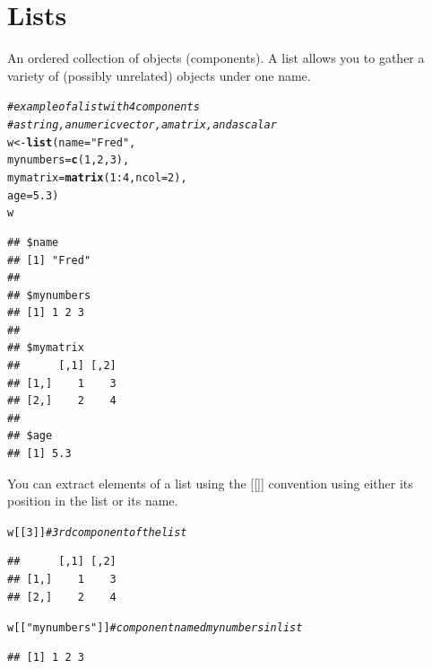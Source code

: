 \documentclass[english,nohyper]{tufte-book}\usepackage[]{graphicx}\usepackage[]{color}
\makeatletter
\newcommand{\hlnum}[1]{\textcolor[rgb]{0.686,0.059,0.569}{#1}}%
\newcommand{\hlstr}[1]{\textcolor[rgb]{0.192,0.494,0.8}{#1}}%
\newcommand{\hlcom}[1]{\textcolor[rgb]{0.678,0.584,0.686}{\textit{#1}}}%
\newcommand{\hlopt}[1]{\textcolor[rgb]{0,0,0}{#1}}%
\newcommand{\hlstd}[1]{\textcolor[rgb]{0.345,0.345,0.345}{#1}}%
\newcommand{\hlkwb}[1]{\textcolor[rgb]{0.69,0.353,0.396}{#1}}%
\newcommand{\hlkwc}[1]{\textcolor[rgb]{0.333,0.667,0.333}{#1}}%
\newcommand{\hlkwd}[1]{\textcolor[rgb]{0.737,0.353,0.396}{\textbf{#1}}}%
\newenvironment{kframe}{%
 \def\at@end@of@kframe{}%
 \ifinner\ifhmode%
  \def\at@end@of@kframe{\end{minipage}}%
  \begin{minipage}{\columnwidth}%
 \fi\fi%
 \def\FrameCommand##1{\hskip\@totalleftmargin \hskip-\fboxsep
 \colorbox{shadecolor}{##1}\hskip-\fboxsep
     \hskip-\linewidth \hskip-\@totalleftmargin \hskip\columnwidth}%
 \MakeFramed {\advance\hsize-\width
   \@totalleftmargin\z@ \linewidth\hsize
   \@setminipage}}%
 {\par\unskip\endMakeFramed%
 \at@end@of@kframe}
\newenvironment{knitrout}{}{} %
\makeatother
\begin{document}
\section{Lists}

An ordered collection of objects (components). A list allows you to
gather a variety of (possibly unrelated) objects under one name. 

\begin{knitrout}
\color{fgcolor}\begin{kframe}
\begin{alltt}
\hlcom{# example of a list with 4 components }
\hlcom{# a string, a numeric vector, a matrix, and a scalar }
\hlstd{w} \hlkwb{<-} \hlkwd{list}\hlstd{(}\hlkwc{name}\hlstd{=}\hlstr{"Fred"}\hlstd{,}
       \hlkwc{mynumbers}\hlstd{=}\hlkwd{c}\hlstd{(}\hlnum{1}\hlstd{,}\hlnum{2}\hlstd{,}\hlnum{3}\hlstd{),}
       \hlkwc{mymatrix}\hlstd{=}\hlkwd{matrix}\hlstd{(}\hlnum{1}\hlopt{:}\hlnum{4}\hlstd{,}\hlkwc{ncol}\hlstd{=}\hlnum{2}\hlstd{),}
       \hlkwc{age}\hlstd{=}\hlnum{5.3}\hlstd{)}
\hlstd{w}
\end{alltt}
\begin{verbatim}
## $name
## [1] "Fred"
## 
## $mynumbers
## [1] 1 2 3
## 
## $mymatrix
##      [,1] [,2]
## [1,]    1    3
## [2,]    2    4
## 
## $age
## [1] 5.3
\end{verbatim}
\end{kframe}
\end{knitrout}


You can extract elements of a list using the {[}{[}{]}{]} convention
using either its position in the list or its name.

\begin{knitrout}
\color{fgcolor}\begin{kframe}
\begin{alltt}
\hlstd{w[[}\hlnum{3}\hlstd{]]}  \hlcom{# 3rd component of the list }
\end{alltt}
\begin{verbatim}
##      [,1] [,2]
## [1,]    1    3
## [2,]    2    4
\end{verbatim}
\begin{alltt}
\hlstd{w[[}\hlstr{"mynumbers"}\hlstd{]]}  \hlcom{# component named mynumbers in list }
\end{alltt}
\begin{verbatim}
## [1] 1 2 3
\end{verbatim}
\end{kframe}
\end{knitrout}
\end{document}
